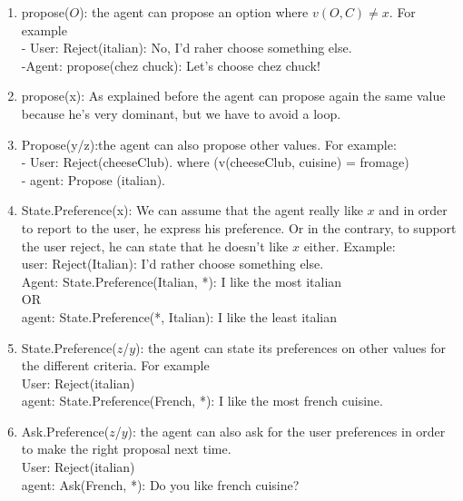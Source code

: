 \documentclass{llncs}
\begin{document}
\begin{enumerate}
 
\item propose($O$): the agent can  propose an option where $v(O,C)  \not= x$. For example
\\ - User: Reject(italian): No, I'd raher choose something else.
\\ -Agent: propose(chez chuck): Let's choose chez chuck!

\item propose(x): As  explained before the agent can  propose  again the same value because he's very dominant, but we have to avoid a loop.

\item Propose(y/z):the agent can also propose other values. 
For example:
\\ - User: Reject(cheeseClub). where (v(cheeseClub, cuisine) = fromage)
\\ - agent: Propose (italian). 

\item State.Preference(x): We can assume that the agent really like $x$ and in order to report to the user, he express his preference. Or in the contrary, to support the user reject, he can state that he doesn't like $x$ either. 
Example: 
\\ user: Reject(Italian): I'd rather choose something else.
\\ Agent: State.Preference(Italian, *): I like the most italian
\\ OR
\\ agent: State.Preference(*, Italian): I like the least italian

\item State.Preference($z$/$y$): the agent can state its preferences on other values for the different criteria. For example
\\ User: Reject(italian)
\\ agent:  State.Preference(French, *): I like the most french cuisine.

\item   Ask.Preference($z$/$y$): the agent can also ask for the user preferences in order to make the right proposal next time.
\\ User: Reject(italian)
\\ agent:  Ask(French, *): Do you like french cuisine?

\end{enumerate}
\end{document}
